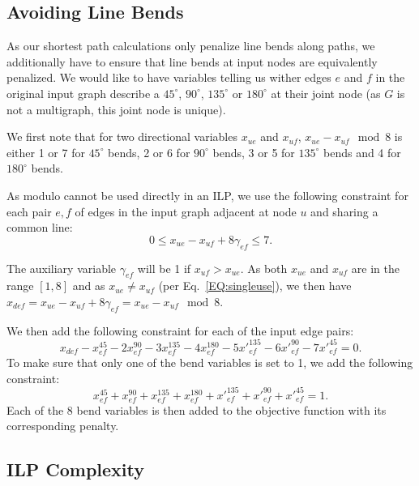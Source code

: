 \documentclass{sig-alternate-sigmod09}
\begin{document}
\subsection{Avoiding Line Bends}

As our shortest path calculations only penalize line bends along paths, we additionally have to ensure that line bends at input nodes are equivalently penalized.
We would like to have variables telling us wither edges $e$ and $f$ in the original input graph describe a $45^{\circ}$, $90^{\circ}$, $135^{\circ}$ or $180^{\circ}$ at their joint node (as $G$ is not a multigraph, this joint node is unique).

We first note that for two directional variables $x_{ue}$ and $x_{uf}$, $x_{ue} - x_{uf} \mod 8$ is either 1 or 7 for $45^\circ$ bends, 2 or 6 for $90^\circ$ bends, 3 or 5 for $135^\circ$ bends and 4 for $180^\circ$ bends.

As modulo cannot be used directly in an ILP, we use the following constraint for each pair $e, f$ of edges in the input graph adjacent at node $u$ and sharing a common line:
\begin{equation} 
  0 \leq x_{ue} - x_{uf} + 8 \gamma_{ef} \leq 7.
\end{equation}

The auxiliary variable $\gamma_{ef}$ will be 1 if $x_{uf} > x_{ue}$. As both $x_{ue}$ and $x_{uf}$ are in the range $[1, 8]$ and as $x_{ue} \neq x_{uf}$ (per Eq.~\ref{EQ:singleuse}), we then have $x_{def} = x_{ue} - x_{uf} + 8 \gamma_{ef} = x_{ue} - x_{uf} \mod 8$.

We then add the following constraint for each of the input edge pairs:
%
\begin{equation} 
  x_{def} - x_{ef}^{45} - 2x_{ef}^{90} - 3x_{ef}^{135} - 4x_{ef}^{180} - 5 {x'}_{ef}^{135} - 6{x'}_{ef}^{90} - 7{x'}_{ef}^{45} = 0.
\end{equation}
%
To make sure that only one of the bend variables is set to 1, we add the following constraint:
%
\begin{equation} 
  x_{ef}^{45} + x_{ef}^{90} + x_{ef}^{135} + x_{ef}^{180} + {x'}_{ef}^{135} + {x'}_{ef}^{90} + {x'}_{ef}^{45} = 1.
\end{equation}
%
Each of the 8 bend variables is then added to the objective function with its corresponding penalty.

\subsection{ILP Complexity}
\end{document}
